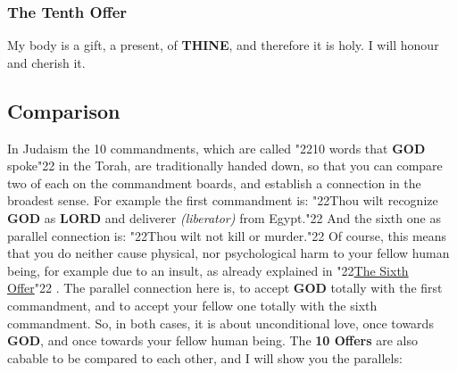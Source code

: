 \documentclass[12pt,a5paper]{article}
\newcommand{\God}[0]{\textbf{GOD}}
\newcommand{\Lord}[0]{\textbf{LORD}}
\newcommand{\Thine}[0]{\textbf{THINE}}
\newcommand{\q}[1]{\char"22{#1}\char"22 }
\begin{document}
	\subsubsection{The Tenth Offer} \label{TheTenthOffer}
		My body is a gift, a present, of {\Thine},
		and therefore it is holy.
		I will honour and cherish it.
	
	\subsection{Comparison}
		In Judaism the 10 commandments,
		which are called \q{10 words that {\God} spoke} in the Torah,
		are traditionally handed down,
		so that you can compare two of each on the commandment boards,
		and establish a connection in the broadest sense.
		For example the first commandment is:
		\q{Thou wilt recognize {\God} as {\Lord} and deliverer \textit{(liberator)} from Egypt.}
		And the sixth one as parallel connection is:
		\q{Thou wilt not kill or murder.}
		Of course,
		this means that you do neither cause physical,
		nor psychological harm to your fellow human being,
		for example due to an insult,
		as already explained in \q{\hyperref[TheSixthOffer]{The Sixth Offer}}.
		The parallel connection here is,
		to accept {\God} totally with the first commandment,
		and to accept your fellow one totally with the sixth commandment.
		So,
		in both cases,
		it is about unconditional love,
		once towards {\God},
		and once towards your fellow human being.
		The \textbf{10 Offers} are also cabable to be compared to each other,
		and I will show you the parallels:
		\\
\end{document}
